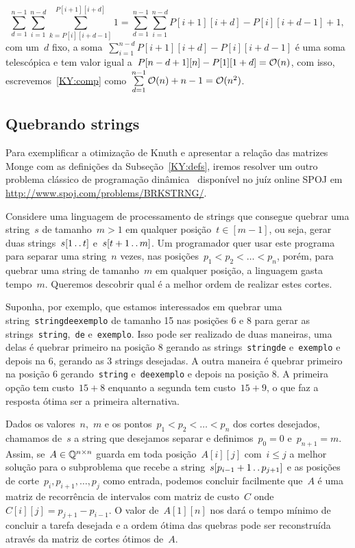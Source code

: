 \begin{equation} \label{KY:comp}
{\sum\limits_{d = 1}^{n-1} \sum\limits_{i=1}^{n-d} \sum\limits_{k=P[i][i+d-1]}^{P[i+1][i+d]} 1 = \sum\limits_{d = 1}^{n-1} \sum\limits_{i=1}^{n-d} P[i+1][i+d] - P[i][i+d-1] + 1} \text{, }
\end{equation}
com um~$d$ fixo, a soma~$\sum\limits_{i=1}^{n-d} P[i+1][i+d] - P[i][i+d-1]$ é uma soma telescópica e tem valor igual a~$P[n-d+1][n] - P[1][1+d] = \mathcal{O}(n)$, com isso, escrevemos~\eqref{KY:comp} como~$\sum\limits_{d=1}^{n-1} \mathcal{O}(n) + n - 1 = \mathcal{O}(n^2)$.


\subsection{Quebrando strings}

Para exemplificar a otimização de Knuth e apresentar a relação das matrizes Monge com as definições da Subseção~\ref{KY:defs}, iremos resolver um outro problema clássico de programação dinâmica~\cite[Exercício~15-9]{CLRS} disponível no juíz online SPOJ em \url{http://www.spoj.com/problems/BRKSTRNG/}. 

Considere uma linguagem de processamento de strings que consegue quebrar uma string~$s$ de tamanho~$m > 1$ em qualquer posição~$t \in [m-1]$, ou seja, gerar duas strings~$s[1 \,.\,.\, t]$ e~$s[t+1 \,.\,.\, m]$. Um programador quer usar este programa para separar uma string~$n$ vezes, nas posições~${p_1 < p_2 < \dots < p_{n}}$, porém, para quebrar uma string de tamanho~$m$ em qualquer posição, a linguagem gasta tempo~$m$. Queremos descobrir qual é a melhor ordem de realizar estes cortes. 

Suponha, por exemplo, que estamos interessados em quebrar uma string~\texttt{stringdeexemplo} de tamanho 15 nas posições 6 e 8 para gerar as strings~\texttt{string},~\texttt{de} e~\texttt{exemplo}. Isso pode ser realizado de duas maneiras, uma delas é quebrar primeiro na posição 8 gerando as strings~\texttt{stringde} e~\texttt{exemplo} e depois na 6, gerando as 3 strings desejadas. A outra maneira é quebrar primeiro na posição 6 gerando~\texttt{string} e~\texttt{deexemplo} e depois na posição 8. A primeira opção tem custo~$15 + 8$ enquanto a segunda tem custo~$15 + 9$, o que faz a resposta ótima ser a primeira alternativa.

Dados os valores~$n$,~$m$ e os pontos~$p_1 < p_2 < \dots < p_{n}$ dos cortes desejados, chamamos de~$s$ a string que desejamos separar e definimos~$p_0 = 0$ e~$p_{n+1} = m$. Assim, se~$A \in \mathbb{Q}^{n \times n}$ guarda em toda posição~$A[i][j]$ com~$i \leq j$ a melhor solução para o subproblema que recebe a string~${s[p_{i-1} + 1 \,.\,.\, p_{j+1}]}$ e as posições de corte~$p_{i},p_{i+1},\dots,p_{j}$ como entrada, podemos concluir facilmente que~$A$ é uma matriz de recorrência de intervalos com matriz de custo~$C$ onde~$C[i][j] = p_{j+1} - p_{i-1}$. O valor de~$A[1][n]$ nos dará o tempo mínimo de concluir a tarefa desejada e a ordem ótima das quebras pode ser reconstruída através da matriz de cortes ótimos de~$A$.

